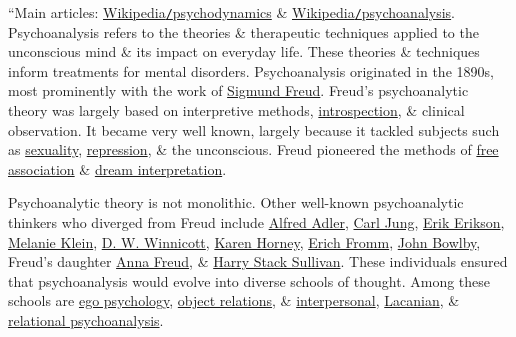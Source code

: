 \documentclass[oneside]{book}
\numberwithin{equation}{section}
\begin{document}
``Main articles: \href{https://en.wikipedia.org/wiki/Psychodynamics}{Wikipedia\texttt{/}psychodynamics} \& \href{https://en.wikipedia.org/wiki/Psychoanalysis}{Wikipedia\texttt{/}psychoanalysis}. Psychoanalysis refers to the theories \& therapeutic techniques applied to the unconscious mind \& its impact on everyday life. These theories \& techniques inform treatments for mental disorders. Psychoanalysis originated in the 1890s, most prominently with the work of \href{https://en.wikipedia.org/wiki/Sigmund_Freud}{Sigmund Freud}. Freud's psychoanalytic theory was largely based on interpretive methods, \href{https://en.wikipedia.org/wiki/Introspection}{introspection}, \& clinical observation. It became very well known, largely because it tackled subjects such as \href{https://en.wikipedia.org/wiki/Human_sexuality}{sexuality}, \href{https://en.wikipedia.org/wiki/Psychological_repression}{repression}, \& the unconscious. Freud pioneered the methods of \href{https://en.wikipedia.org/wiki/Free_association_(psychology)}{free association} \& \href{https://en.wikipedia.org/wiki/Dream_interpretation}{dream interpretation}.

Psychoanalytic theory is not monolithic. Other well-known psychoanalytic thinkers who diverged from Freud include \href{https://en.wikipedia.org/wiki/Alfred_Adler}{Alfred Adler}, \href{https://en.wikipedia.org/wiki/Carl_Jung}{Carl Jung}, \href{https://en.wikipedia.org/wiki/Erik_Erikson}{Erik Erikson}, \href{https://en.wikipedia.org/wiki/Melanie_Klein}{Melanie Klein}, \href{https://en.wikipedia.org/wiki/Donald_Winnicott}{D. W. Winnicott}, \href{https://en.wikipedia.org/wiki/Karen_Horney}{Karen Horney}, \href{https://en.wikipedia.org/wiki/Erich_Fromm}{Erich Fromm}, \href{https://en.wikipedia.org/wiki/John_Bowlby}{John Bowlby}, Freud's daughter \href{https://en.wikipedia.org/wiki/Anna_Freud}{Anna Freud}, \& \href{https://en.wikipedia.org/wiki/Harry_Stack_Sullivan}{Harry Stack Sullivan}. These individuals ensured that psychoanalysis would evolve into diverse schools of thought. Among these schools are \href{https://en.wikipedia.org/wiki/Ego_psychology}{ego psychology}, \href{https://en.wikipedia.org/wiki/Object_relations}{object relations}, \& \href{https://en.wikipedia.org/wiki/Interpersonal_psychoanalysis}{interpersonal}, \href{https://en.wikipedia.org/wiki/Jacques_Lacan}{Lacanian}, \& \href{https://en.wikipedia.org/wiki/Relational_psychoanalysis}{relational psychoanalysis}.
\end{document}
